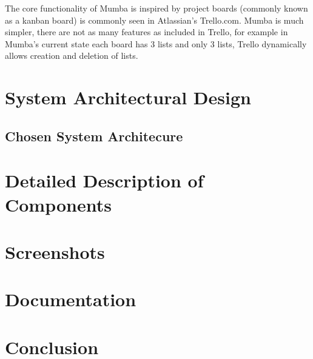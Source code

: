 \documentclass[letterpaper]{article}
\begin{document}
The core functionality of Mumba is inspired by project boards (commonly known as  a kanban board) is commonly seen in Atlassian's Trello.com. Mumba is much simpler, there are not as many features as included in Trello, for example in Mumba's current state each board has 3 lists and only 3 lists, Trello dynamically allows creation and deletion of lists.

\section{System Architectural Design}



\subsection{Chosen System Architecure}

\section{Detailed Description of Components}

\section{Screenshots}

\section{Documentation}

\section{Conclusion}
\end{document}

